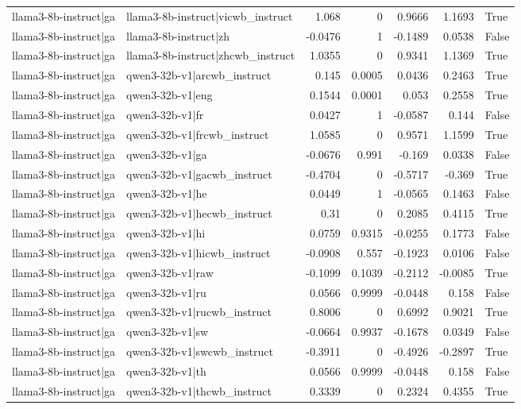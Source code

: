 \begin{table}
\begin{tabular}{l l r r r r l}
llama3-8b-instruct|ga & llama3-8b-instruct|vicwb_instruct & 1.068 & 0 & 0.9666 & 1.1693 & True \\
llama3-8b-instruct|ga & llama3-8b-instruct|zh & -0.0476 & 1 & -0.1489 & 0.0538 & False \\
llama3-8b-instruct|ga & llama3-8b-instruct|zhcwb_instruct & 1.0355 & 0 & 0.9341 & 1.1369 & True \\
llama3-8b-instruct|ga & qwen3-32b-v1|arcwb_instruct & 0.145 & 0.0005 & 0.0436 & 0.2463 & True \\
llama3-8b-instruct|ga & qwen3-32b-v1|eng & 0.1544 & 0.0001 & 0.053 & 0.2558 & True \\
llama3-8b-instruct|ga & qwen3-32b-v1|fr & 0.0427 & 1 & -0.0587 & 0.144 & False \\
llama3-8b-instruct|ga & qwen3-32b-v1|frcwb_instruct & 1.0585 & 0 & 0.9571 & 1.1599 & True \\
llama3-8b-instruct|ga & qwen3-32b-v1|ga & -0.0676 & 0.991 & -0.169 & 0.0338 & False \\
llama3-8b-instruct|ga & qwen3-32b-v1|gacwb_instruct & -0.4704 & 0 & -0.5717 & -0.369 & True \\
llama3-8b-instruct|ga & qwen3-32b-v1|he & 0.0449 & 1 & -0.0565 & 0.1463 & False \\
llama3-8b-instruct|ga & qwen3-32b-v1|hecwb_instruct & 0.31 & 0 & 0.2085 & 0.4115 & True \\
llama3-8b-instruct|ga & qwen3-32b-v1|hi & 0.0759 & 0.9315 & -0.0255 & 0.1773 & False \\
llama3-8b-instruct|ga & qwen3-32b-v1|hicwb_instruct & -0.0908 & 0.557 & -0.1923 & 0.0106 & False \\
llama3-8b-instruct|ga & qwen3-32b-v1|raw & -0.1099 & 0.1039 & -0.2112 & -0.0085 & True \\
llama3-8b-instruct|ga & qwen3-32b-v1|ru & 0.0566 & 0.9999 & -0.0448 & 0.158 & False \\
llama3-8b-instruct|ga & qwen3-32b-v1|rucwb_instruct & 0.8006 & 0 & 0.6992 & 0.9021 & True \\
llama3-8b-instruct|ga & qwen3-32b-v1|sw & -0.0664 & 0.9937 & -0.1678 & 0.0349 & False \\
llama3-8b-instruct|ga & qwen3-32b-v1|swcwb_instruct & -0.3911 & 0 & -0.4926 & -0.2897 & True \\
llama3-8b-instruct|ga & qwen3-32b-v1|th & 0.0566 & 0.9999 & -0.0448 & 0.158 & False \\
llama3-8b-instruct|ga & qwen3-32b-v1|thcwb_instruct & 0.3339 & 0 & 0.2324 & 0.4355 & True \\

\end{tabular}
\end{table}
